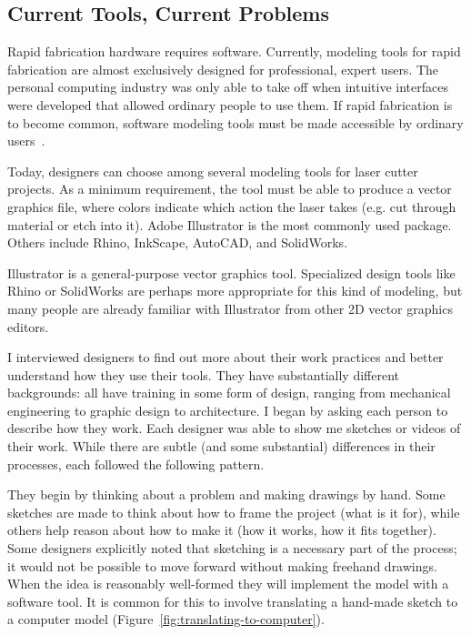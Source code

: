 \documentclass[11pt]{article}
\begin{document}
\subsection{Current Tools, Current Problems}

Rapid fabrication hardware requires software. Currently, modeling
tools for rapid fabrication are almost exclusively designed for
professional, expert users. The personal computing industry was only
able to take off when intuitive interfaces were developed that allowed
ordinary people to use them. If rapid fabrication is to become common,
software modeling tools must be made accessible by ordinary
users~\cite{lipson-homefactory}.

Today, designers can choose among several modeling tools for laser
cutter projects. As a minimum requirement, the tool must be able to
produce a vector graphics file, where colors indicate which action the
laser takes (e.g. cut through material or etch into it). Adobe
Illustrator is the most commonly used package. Others include Rhino,
InkScape, AutoCAD, and SolidWorks.

Illustrator is a general-purpose vector graphics tool. Specialized
design tools like Rhino or SolidWorks are perhaps more appropriate for
this kind of modeling, but many people are already familiar with
Illustrator from other 2D vector graphics editors. 

I interviewed designers to find out more about their work practices
and better understand how they use their tools. They have
substantially different backgrounds: all have training in some form of
design, ranging from mechanical engineering to graphic design to
architecture. I began by asking each person to describe how they
work. Each designer was able to show me sketches or videos of their
work. While there are subtle (and some substantial) differences in
their processes, each followed the following pattern.

They begin by thinking about a problem and making drawings by
hand. Some sketches are made to think about how to frame the project
(what is it for), while others help reason about how to make it (how
it works, how it fits together). Some designers explicitly noted that
sketching is a necessary part of the process; it would not be possible
to move forward without making freehand drawings. When the idea is
reasonably well-formed they will implement the model with a software
tool. It is common for this to involve translating a hand-made sketch
to a computer model (Figure~\ref{fig:translating-to-computer}). 
\end{document}
